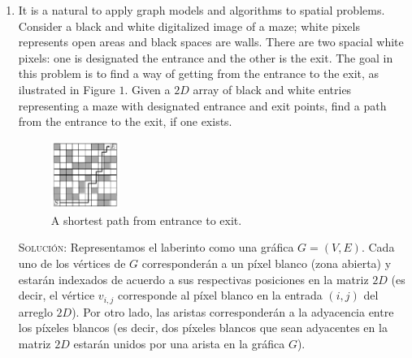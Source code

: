 \documentclass[letterpaper,11pt]{article}
\begin{document}
\begin{enumerate}
    \item It is a natural to apply graph models and algorithms to spatial 
    problems. Consider a black and white digitalized image of a maze; white 
    pixels represents open areas and black spaces are walls. There are two
    spacial white pixels: one is designated the entrance and the other is the 
    exit. The goal in this problem is to find a way of getting from the entrance 
    to the exit, as ilustrated in Figure $1$. Given a $2D$ array of black and 
    white entries representing a maze with designated entrance and exit points, 
    find a path from the entrance to the exit, if one exists.
    \begin{figure}[H]
        \centering
        \includegraphics[width=0.21\textwidth]{imagenes/path.png}
        \caption{A shortest path from entrance to exit.}
    \end{figure}

    \textsc{Solución:} Representamos el laberinto como una gráfica $G = (V, E)$.
    Cada uno de los vértices de $G$ corresponderán a un píxel blanco (zona 
    abierta) y estarán indexados de acuerdo a sus respectivas posiciones en la 
    matriz $2D$ (es decir, el vértice $v_{i,j}$ corresponde al píxel blanco en 
    la entrada $(i,j)$ del arreglo $2D$). Por otro lado, las aristas 
    corresponderán a la adyacencia entre los píxeles blancos (es decir, dos
    píxeles blancos que sean adyacentes en la matriz $2D$ estarán unidos por
    una arista en la gráfica $G$).


\end{enumerate}
\end{document}
